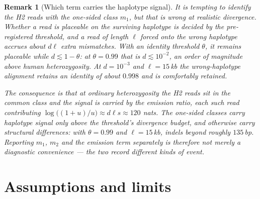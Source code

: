 \documentclass[11pt]{article}
\newtheorem{remark}{Remark}
\begin{document}
\begin{remark}[Which term carries the haplotype signal]
\label{rem:diploid-class}
It is tempting to identify the H2 reads with the one-sided class $m_1$, but
that is wrong at realistic divergence.  Whether a read is placeable on the
surviving haplotype is decided by the pre-registered threshold, and a read of
length $\ell$ forced onto the wrong haplotype accrues about $d\ell$ extra
mismatches.  With an identity threshold $\theta$, it remains placeable while
$d \lesssim 1-\theta$: at $\theta = 0.99$ that is $d \lesssim 10^{-2}$, an
order of magnitude above human heterozygosity.  At $d = 10^{-3}$ and
$\ell = 15$\,kb the wrong-haplotype alignment retains an identity of about
$0.998$ and is comfortably retained.

The consequence is that at ordinary heterozygosity the H2 reads sit in the
\emph{common} class and the signal is carried by the emission ratio, each such
read contributing $\log\!\big((1+u)/u\big) \approx d\ell s \approx 120$ nats.
The one-sided classes carry haplotype signal only above the threshold's
divergence budget, and otherwise carry structural differences: with
$\theta = 0.99$ and $\ell = 15$\,kb, indels beyond roughly $135$\,bp.
Reporting $m_1$, $m_2$ and the emission term separately is therefore not
merely a diagnostic convenience --- the two record different kinds of event.
\end{remark}

\section{Assumptions and limits}
\end{document}
